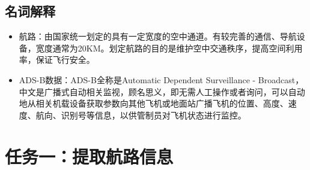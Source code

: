 \documentclass[GBK]{ctexart}
\begin{document}
\begin{spacing}{1.5}
\begin{table}[H]
\begin{tabular}{|r|l|}
%
    \bottomrule[2pt]
    \end{tabular}%
  \label{tab:addlabel}%
\end{table}%
\subsection{名词解释}
\begin{itemize}
  \item 航路\cite{hl}：由国家统一划定的具有一定宽度的空中通道。有较完善的通信、导航设备，宽度通常为20KM。划定航路的目的是维护空中交通秩序，提高空间利用率，保证飞行安全。
  \item ADS-B数据\cite{ads}：ADS-B全称是Automatic Dependent Surveillance - Broadcast，中文是广播式自动相关监视，顾名思义，即无需人工操作或者询问，可以自动地从相关机载设备获取参数向其他飞机或地面站广播飞机的位置、高度、速度、航向、识别号等信息，以供管制员对飞机状态进行监控。
\end{itemize}
\section{任务一：提取航路信息}

\end{spacing}
\end{document}
